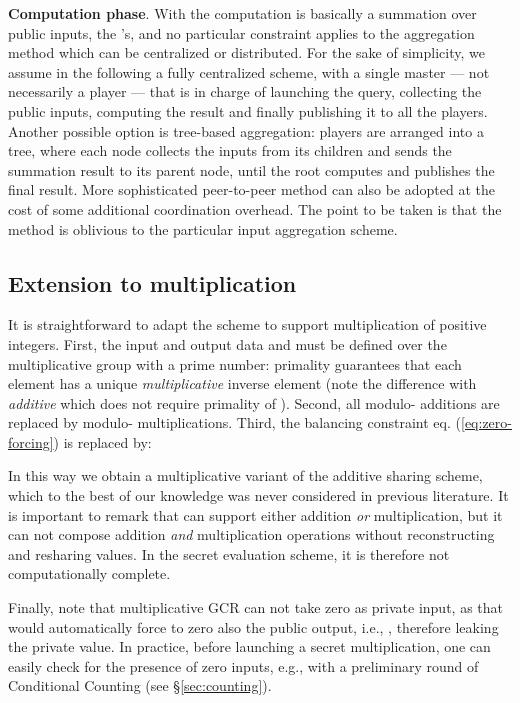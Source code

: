 \documentclass{sig-alternate}
\begin{document}
{\bf Computation phase}.   
With \ata the computation is basically a summation over  public inputs, the 's,  and 
no particular constraint applies to the aggregation method which can be centralized or distributed.
For the sake of simplicity,  we assume in the following a fully centralized scheme, with a single master --- not necessarily a player ---  that is in charge of launching the query, collecting the  public inputs, computing the result and finally publishing it to all the players.  
Another possible option is tree-based aggregation:  players are arranged into a tree, where each node collects the inputs from its children and sends the summation result to its parent node, until the root computes and publishes the final result. 
More sophisticated peer-to-peer method can also be adopted at the cost of some additional coordination overhead. 
The point to be taken is that the \ata method is oblivious to the particular input aggregation scheme. 

\subsection{Extension to multiplication} \label{sec:multiplication}
It is straightforward to adapt the \ata scheme to support multiplication of positive integers.
First, the input and output data  and    must be defined over the multiplicative group   with  a prime number:
primality guarantees that each element has a unique {\em multiplicative} inverse element 
(note the difference with {\em additive} \ata which does not require primality of ).
Second, all modulo- additions are replaced by modulo- multiplications.
Third, the balancing constraint eq.  (\ref{eq:zero-forcing}) is replaced by:

In this way we obtain a multiplicative variant of the additive sharing scheme, which to the best of our knowledge was never considered in previous literature. 
It is important to remark that \ata can support either addition {\em or} multiplication, but it can not compose addition {\em and} multiplication operations without reconstructing and resharing values. In the secret evaluation scheme, it is therefore not computationally complete.

Finally, note that multiplicative GCR can not take zero as private input, as that would automatically force to zero also the public output, i.e., , therefore leaking the private value. In practice,  before launching a secret multiplication, one can easily check for the presence of zero inputs, e.g., with a preliminary  round of Conditional Counting (see \S \ref{sec:counting}).
\end{document}
